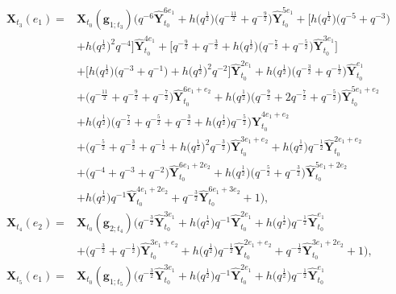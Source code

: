 \documentclass[10pt,a4paper]{amsart}
\numberwithin{equation}{section}
\begin{document}
\begin{Example}[type $G_{2}$]
\begin{align*}
 \mathbf{X}_{t_3}(e_1)={}&\mathbf{X}_{t_0}(\mathbf{g}_{1;t_3})\bigl(q^{-6}\mathbf{\hat{Y}}_{t_0}^{6e_1}+h\bigl(q^{\frac{1}{2}}\bigr)\bigl(q^{-\frac{11}{2}}+q^{-\frac{9}{2}}\bigr)
 \mathbf{\hat{Y}}_{t_0}^{5e_1}+\big[h\bigl(q^{\frac{1}{2}}\bigr)\bigl(q^{-5}+q^{-3}\bigr)\\
 & +h\bigl(q^{\frac{1}{2}}\bigr)^2q^{-4}\big]\mathbf{\hat{Y}}_{t_0}^{4e_1}+\big[q^{-\frac{9}{2}}+q^{-\frac{3}{2}}+h\bigl(q^{\frac{1}{2}}\bigr)\bigl(q^{-\frac{7}{2}}+q^{-\frac{5}{2}}\bigr)
 \mathbf{\hat{Y}}_{t_0}^{3e_1}\big]\\
 & +[h\bigl(q^{\frac{1}{2}}\bigr)\bigl(q^{-3}+q^{-1}\bigr)+h\bigl(q^{\frac{1}{2}}\bigr)^2q^{-2}\big]\mathbf{\hat{Y}}_{t_0}^{2e_1}+h\bigl(q^{\frac{1}{2}}\bigr)
 \bigl(q^{-\frac{3}{2}}+q^{-\frac{1}{2}}\bigr)\mathbf{\hat{Y}}_{t_0}^{e_1}\\
 & +\bigl(q^{-\frac{11}{2}}+q^{-\frac{9}{2}}+q^{-\frac{7}{2}}\bigr)\mathbf{\hat{Y}}_{t_0}^{6e_1+e_2}+h\bigl(q^{\frac{1}{2}}\bigr)
 \bigl(q^{-\frac{9}{2}}+2q^{-\frac{7}{2}}+q^{-\frac{5}{2}}\bigr)\mathbf{\hat{Y}}_{t_0}^{5e_1+e_2}\\
 & +h\bigl(q^{\frac{1}{2}}\bigr)\bigl(q^{-\frac{7}{2}}+q^{-\frac{5}{2}}+q^{-\frac{3}{2}}+h\bigl(q^{\frac{1}{2}}\bigr)q^{-\frac{5}{2}}\bigr)\mathbf{\hat{Y}}_{t_0}^{4e_1+e_2}\\
 & +\bigl(q^{-\frac{5}{2}}+q^{-\frac{3}{2}}+q^{-\frac{1}{2}}+h\bigl(q^{\frac{1}{2}}\bigr)^2q^{-\frac{3}{2}}\bigr)\mathbf{\hat{Y}}_{t_0}^{3e_1+e_2}
 +h\bigl(q^{\frac{1}{2}}\bigr)q^{-\frac{1}{2}}\mathbf{\hat{Y}}_{t_0}^{2e_1+e_2}\\
 & +\bigl(q^{-4}+q^{-3}+q^{-2}\bigr)\mathbf{\hat{Y}}_{t_0}^{6e_1+2e_2}+h\bigl(q^{\frac{1}{2}}\bigr)\bigl(q^{-\frac{5}{2}}+q^{-\frac{3}{2}}\bigr)\mathbf{\hat{Y}}_{t_0}^{5e_1+2e_2}\\
 & +h\bigl(q^{\frac{1}{2}}\bigr)q^{-1}\mathbf{\hat{Y}}_{t_0}^{4e_1+2e_2}+q^{-\frac{3}{2}}\mathbf{\hat{Y}}_{t_0}^{6e_1+3e_2}+1
 \bigr),\\
 \mathbf{X}_{t_4}(e_2)={}&\mathbf{X}_{t_0}(\mathbf{g}_{2;t_4})\bigl(q^{-\frac{3}{2}}\mathbf{\hat{Y}}_{t_0}^{3e_1}+h\bigl(q^{\frac{1}{2}}\bigr)q^{-1}\mathbf{\hat{Y}}_{t_0}^{2e_1}
 +h\bigl(q^{\frac{1}{2}}\bigr)q^{-\frac{1}{2}}\mathbf{\hat{Y}}_{t_0}^{e_1}\\
 & +\bigl(q^{-\frac{3}{2}}+q^{-\frac{1}{2}}\bigr)\mathbf{\hat{Y}}_{t_0}^{3e_1+e_2}+h\bigl(q^{\frac{1}{2}}\bigr)q^{-\frac{1}{2}}\mathbf{\hat{Y}}_{t_0}^{2e_1+e_2}
 +q^{-\frac{1}{2}}\mathbf{\hat{Y}}_{t_0}^{3e_1+2e_2}+1
 \bigr),\\
 \mathbf{X}_{t_5}(e_1)={}&\mathbf{X}_{t_0}(\mathbf{g}_{1;t_5})\bigl(q^{-\frac{3}{2}}\mathbf{\hat{Y}}_{t_0}^{3e_1}+h\bigl(q^{\frac{1}{2}}\bigr)q^{-1}\mathbf{\hat{Y}}_{t_0}^{2e_1}+h\bigl(q^{\frac{1}{2}}\bigr)q^{-\frac{1}{2}}\mathbf{\hat{Y}}_{t_0}^{e_1}\\

\end{align*}
\end{Example}
\end{document}
